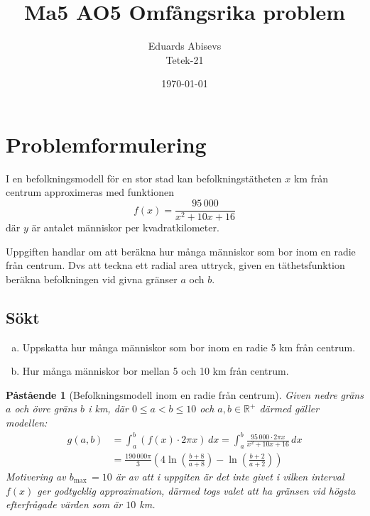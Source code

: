 \documentclass{article}
\title{Ma5 AO5 Omfångsrika problem}
\author{Eduards Abisevs \\ Tetek-21}
\date{\today}
\newtheorem{proposition}{Påstående}
\begin{document}
\maketitle

\section*{Problemformulering}
I en befolkningsmodell för en stor stad kan befolkningstätheten $x$ km från
centrum approximeras med funktionen 
\[
f(x) = \frac{95\,000}{x^2 + 10x + 16}
\]
där $y$ är antalet människor per kvadratkilometer.

Uppgiften handlar om att beräkna hur många människor som bor inom en radie från
centrum. Dvs att teckna ett radial area uttryck, given en täthetsfunktion
beräkna befolkningen vid givna gränser \( a \) och \( b \).


\noindent
\subsection*{Sökt}
\begin{enumerate}[(a)]
    \item Uppskatta hur många människor som bor inom en radie 5 km från centrum.
    \item Hur många människor bor mellan 5 och 10 km från centrum.
\end{enumerate}

\begin{proposition}[Befolkningsmodell inom en radie från centrum] Given nedre
	gräns \( a \) och övre gräns \( b \) i km, där \( 0 \le a < b \le 10 \) och
	\( a, b \in \mathbb{R}^+ \) därmed gäller modellen: \begin{align*}
		g(a,b) &= \int_{a}^{b} \left(f(x) \cdot 2\pi x\right) \, dx
		= \int_{a}^{b} \frac{95\,000 \cdot 2\pi x}{x^2 + 10x + 16} \, dx
		  \\
		&= \frac{190\,000 \pi}{3}
		\left(4\ln{\left(\frac{b + 8}{a + 8}\right)} 
			-
		\ln{\left(\frac{b + 2}{a + 2}\right)} \right)
	\end{align*}
	Motivering av \( b_\max \, = 10 \) är av att i uppgiten är det inte givet
	i vilken interval \( f(x) \) ger godtycklig approximation, därmed togs
valet att ha gränsen vid högsta efterfrågade värden som är \( 10 \) km.
\end{proposition}
\end{document}
